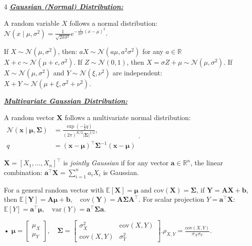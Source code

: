 \documentclass[10pt]{article}
\newcommand{\bulletPoint}[1]{\ul{\textit{\textbf{#1}}}}
\begin{document}
\begin{multicols*}{4}
\bulletPoint{Gaussian (Normal) Distribution:} \quad

A random variable $X$ follows a normal distribution:
$\mathcal{N}(x \mid \mu, \sigma^2) = \frac{1}{\sqrt{2\pi\sigma^2}} e^{-\frac{1}{2\sigma^2} (x-\mu)^2}$.

If $X \sim \mathcal{N}(\mu, \sigma^2)$, then:
$aX \sim \mathcal{N}(a\mu, a^2\sigma^2)$ for any $a \in \mathbb{R}$
$X + c \sim \mathcal{N}(\mu + c, \sigma^2)$. 
If $Z \sim \mathcal{N}(0,1)$, then $X = \sigma Z + \mu \sim \mathcal{N}(\mu, \sigma^2)$. 
If $X \sim \mathcal{N}(\mu, \sigma^2)$ and $Y \sim \mathcal{N}(\xi, \nu^2)$ are independent:
$X + Y \sim \mathcal{N}(\mu + \xi, \sigma^2 + \nu^2)$.


\bulletPoint{Multivariate Gaussian Distribution:} \quad

A random vector $\mathbf{X}$ follows a multivariate normal distribution:
$\begin{aligned}
\mathcal{N}(\mathbf{x} \mid \boldsymbol{\mu}, \boldsymbol{\Sigma})
&= \frac{\exp(-\frac{1}{2}q)}
{(2\pi)^{K/2}|\boldsymbol{\Sigma}|^{1/2}},\\
q&=(\mathbf{x}-\boldsymbol{\mu})^\top
\boldsymbol{\Sigma}^{-1}(\mathbf{x}-\boldsymbol{\mu})
\end{aligned}$.

$\mathbf{X} = [X_1, \dots, X_n]^\top$ is \textit{jointly Gaussian} if for any vector $\mathbf{a} \in \mathbb{R}^n$, the linear combination: $\mathbf{a}^\top \mathbf{X} = \sum_{i=1}^{n} a_i X_i$ is Gaussian. 

For a general random vector with $\mathbb{E}[\mathbf{X}]=\boldsymbol{\mu}$ and $\text{cov}(\mathbf{X})=\boldsymbol{\Sigma}$,
if $\mathbf{Y}=\mathbf{A}\mathbf{X}+\mathbf{b}$, then
$\mathbb{E}[\mathbf{Y}]=\mathbf{A}\boldsymbol{\mu}+\mathbf{b}, \quad
\text{cov}(\mathbf{Y})=\mathbf{A}\boldsymbol{\Sigma}\mathbf{A}^\top$. 
For scalar projection $Y=\mathbf{a}^\top\mathbf{X}$:
$\mathbb{E}[Y]=\mathbf{a}^\top\boldsymbol{\mu}, \quad
\text{var}(Y)=\mathbf{a}^\top\boldsymbol{\Sigma}\mathbf{a}$.

• $\boldsymbol{\mu} = 
\begin{bmatrix} \mu_X \\ \mu_Y \end{bmatrix}, \quad
\boldsymbol{\Sigma} = 
\begin{bmatrix} \sigma_X^2 & \text{cov}(X,Y) \\ \text{cov}(X,Y) & \sigma_Y^2 \end{bmatrix}$.\quad $\rho_{X,Y} = \frac{\text{cov}(X,Y)}{\sigma_X \sigma_Y}$.


\end{multicols*}
\end{document}
